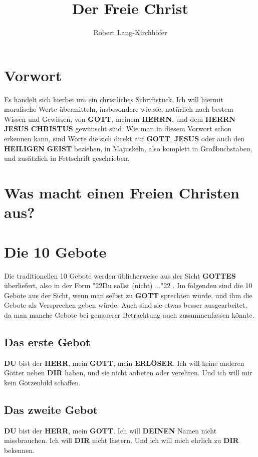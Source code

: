 \documentclass[12pt,a4paper]{article}
\title{\textbf{Der Freie Christ}}
\author{Robert Lang-Kirchh\"ofer}
\date{}
\newcommand{\Christus}[0]{\textbf{CHRISTUS}}
\newcommand{\Deinen}[0]{\textbf{DEINEN}}
\newcommand{\Dir}[0]{\textbf{DIR}}
\newcommand{\Du}[0]{\textbf{DU}}
\newcommand{\Erloeser}[0]{\textbf{ERL\"OSER}}
\newcommand{\Geist}[0]{\textbf{GEIST}}
\newcommand{\Gott}[0]{\textbf{GOTT}}
\newcommand{\Gottes}[0]{\textbf{GOTTES}}
\newcommand{\Herr}[0]{\textbf{HERR}}
\newcommand{\Herrn}[0]{\textbf{HERRN}}
\newcommand{\Jesus}[0]{\textbf{JESUS}}
\newcommand{\Heiligen}[0]{\textbf{HEILIGEN}}
\newcommand{\q}[1]{\char"22{#1}\char"22 }
\begin{document}
	\setcounter{section}{-1}
	\setlength{\parindent}{0mm}
	\maketitle

	\newpage
	\tableofcontents

	\newpage
	\section{Vorwort}
	Es handelt sich hierbei um ein christliches Schriftst\"uck.
	Ich will hiermit moralische Werte \"ubermitteln,
	insbesondere wie sie,
	nat\"urlich nach bestem Wissen und Gewissen,
	von {\Gott},
	meinem {\Herrn},
	und dem {\Herrn} {\Jesus} {\Christus} gew\"unscht sind.
	Wie man in diesem Vorwort schon erkennen kann,
	sind Worte die sich direkt auf {\Gott},
	{\Jesus} oder auch den {\Heiligen} {\Geist} beziehen,
	in Majuskeln,
	also komplett in Gro{\ss}buchstaben,
	und zus\"atzlich in Fettschrift geschrieben.
	
	\section{Was macht einen Freien Christen aus?}
	
	
	\section{Die 10 Gebote}
	Die traditionellen 10 Gebote werden \"ublicherweise aus der Sicht {\Gottes} \"uberliefert,
	also in der Form \q{Du sollst (nicht) ...}.
	Im folgenden sind die 10 Gebote aus der Sicht,
	wenn man selbst zu {\Gott} sprechten w\"urde,
	und ihm die Gebote als Versprechen geben w\"urde.
	Auch sind sie etwas besser ausgearbeitet,
	da man manche Gebote bei genauerer Betrachtung auch zusammenfassen k\"onnte.
	
	\subsection{Das erste Gebot}
	{\Du} bist der {\Herr},
	mein {\Gott},
	mein {\Erloeser}.
	Ich will keine anderen G\"otter neben {\Dir} haben,
	und sie nicht anbeten oder verehren.
	Und ich will mir kein G\"otzenbild schaffen.
	
	\subsection{Das zweite Gebot}
	{\Du} bist der {\Herr},
	mein {\Gott}.
	Ich will {\Deinen} Namen nicht missbrauchen.
	Ich will {\Dir} nicht l\"astern.
	Und ich will mich ehrlich zu {\Dir} bekennen.
		
\end{document}
